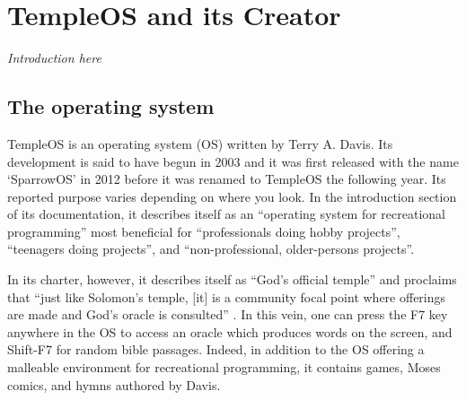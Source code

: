 \documentclass[Draft.tex]{subfiles}
\begin{document}
\chapter{TempleOS and its Creator}

\textit{Introduction here}


\section*{The operating system}

TempleOS is an operating system (OS) written by Terry A. Davis.
Its development is said to have begun in 2003
and it was first released with the name `SparrowOS' in 2012
before it was renamed to TempleOS the following year.
Its reported purpose varies depending on where you look.
In the introduction section of its documentation, it describes itself as
an ``operating system for recreational programming'' most beneficial for
``professionals doing hobby projects'', ``teenagers doing projects'',
and ``non-professional, older-persons projects''.

In its charter, however, it describes itself as ``God's official temple''
and proclaims that
``just like Solomon’s temple, [it] is a community focal point
where offerings are made and God’s oracle is consulted''
\parencite{Charter}\footnotemark.
In this vein, one can press the F7 key anywhere in the OS
to access an oracle which produces words on the screen,
and Shift-F7 for random bible passages.
Indeed, in addition to the OS offering
a malleable environment for recreational programming,
it contains games, Moses comics, and hymns authored by Davis.

\end{document}
